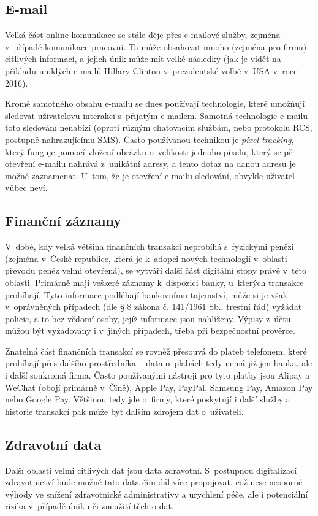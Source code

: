 \subsection{E-mail}
Velká část online komunikace se stále děje přes e-mailové služby, zejména v~případě komunikace pracovní. Ta může obsahovat mnoho (zejména pro firmu) citlivých informací, a jejich únik může mít velké následky (jak je vidět na příkladu uniklých e-mailů Hillary Clinton v~prezidentské volbě v~USA v~roce 2016).

Kromě samotného obsahu e-mailu se dnes používají technologie, které umožňují sledovat uživatelovu interakci s~přijatým e-mailem. Samotná technologie e-mailu toto sledování nenabízí (oproti různým chatovacím službám, nebo protokolu RCS, postupně nahrazujícímu SMS). Často používanou technikou je \textit{pixel tracking}, který funguje pomocí vložení  obrázku o~velikosti jednoho pixelu, který se při otevření e-mailu nahrává z~unikátní adresy, a tento dotaz na danou adresu je možné zaznamenat. U~tom, že je otevření e-mailu sledování, obvykle uživatel vůbec neví.

\subsection{Finanční záznamy}
V~době, kdy velká většina finančních transakcí neprobíhá s~fyzickými penězi (zejména v~České republice, která je k~adopci nových technologií v~oblasti převodu peněz velmi otevřená), se vytváří další část digitální stopy právě v~této oblasti.
Primárně mají veškeré záznamy k~dispozici banky, u~kterých transakce probíhají. Tyto informace podléhají bankovnímu tajemství, může si je však v~oprávněných případech (dle § 8 zákona č. 141/1961 Sb., trestní řád) vyžádat policie, a to bez vědomí osoby, jejíž informace jsou nahlíženy. Výpisy z~účtu můžou být vyžadovány i v~jiných případech, třeba při bezpečnostní prověrce.

Znatelná část finančních transakcí se rovněž přesouvá do plateb telefonem, které probíhají přes dalšího prostředníka -- data o~plabách tedy nemá již jen banka, ale i další soukromá firma. Často používanými nástroji pro tyto platby jsou Alipay a WeChat (obojí primárně v~Číně), Apple Pay, PayPal, Samsung Pay, Amazon Pay nebo Google Pay. Většinou tedy jde o~firmy, které poskytují i další služby a historie transakcí pak může být dalším zdrojem dat o~uživateli.

\subsection{Zdravotní data}
Další oblastí velmi citlivých dat jsou data zdravotní. S~postupnou digitalizací zdravotnictví bude možné tato data čím dál více propojovat, což nese nesporné výhody ve snížení zdravotnické administrativy a urychlení péče, ale i potenciální rizika v~případě úniku či zneužití těchto dat.

